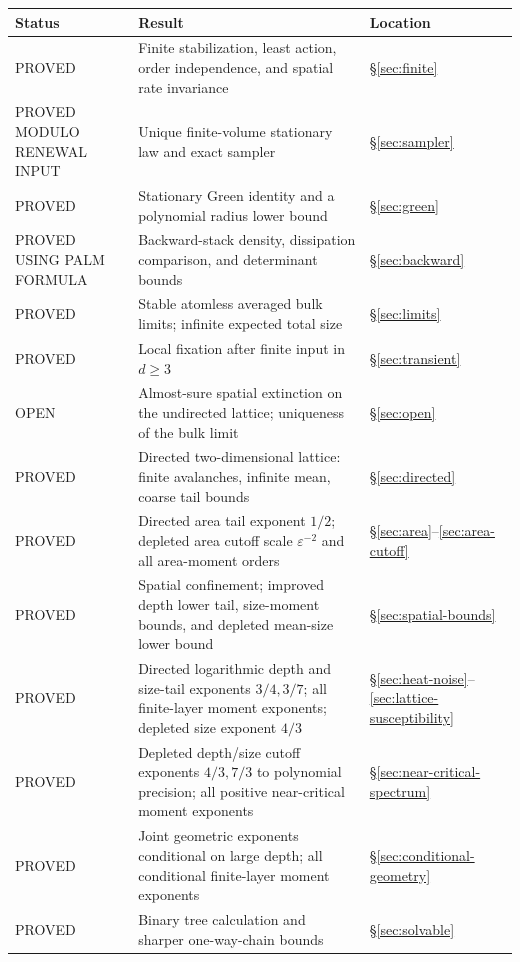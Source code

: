 \documentclass[11pt]{article}
\numberwithin{equation}{section}
\theoremstyle{definition}
\begin{document}
\begin{longtable}{@{}>{\raggedright\arraybackslash}p{}>{\raggedright\arraybackslash}p{}>{\raggedright\arraybackslash}p{}@{}}
\toprule
Status & Result & Location\\\midrule\endhead
PROVED & Finite stabilization, least action, order independence, and spatial rate invariance & \S\ref{sec:finite}\\
PROVED MODULO RENEWAL INPUT & Unique finite-volume stationary law and exact sampler & \S\ref{sec:sampler}\\
PROVED & Stationary Green identity and a polynomial radius lower bound & \S\ref{sec:green}\\
PROVED USING PALM FORMULA & Backward-stack density, dissipation comparison, and determinant bounds & \S\ref{sec:backward}\\
PROVED & Stable atomless averaged bulk limits; infinite expected total size & \S\ref{sec:limits}\\
PROVED & Local fixation after finite input in $d\ge3$ & \S\ref{sec:transient}\\
OPEN & Almost-sure spatial extinction on the undirected lattice; uniqueness of the bulk limit & \S\ref{sec:open}\\
PROVED & Directed two-dimensional lattice: finite avalanches, infinite mean, coarse tail bounds & \S\ref{sec:directed}\\
PROVED & Directed area tail exponent $1/2$; depleted area cutoff scale $\varepsilon^{-2}$ and all area-moment orders & \S\ref{sec:area}--\ref{sec:area-cutoff}\\
PROVED & Spatial confinement; improved depth lower tail, size-moment bounds, and depleted mean-size lower bound & \S\ref{sec:spatial-bounds}\\
PROVED & Directed logarithmic depth and size-tail exponents $3/4,3/7$; all finite-layer moment exponents; depleted size exponent $4/3$ & \S\ref{sec:heat-noise}--\ref{sec:lattice-susceptibility}\\
PROVED & Depleted depth/size cutoff exponents $4/3,7/3$ to polynomial precision; all positive near-critical moment exponents & \S\ref{sec:near-critical-spectrum}\\
PROVED & Joint geometric exponents conditional on large depth; all conditional finite-layer moment exponents & \S\ref{sec:conditional-geometry}\\
PROVED & Binary tree calculation and sharper one-way-chain bounds & \S\ref{sec:solvable}\\

\end{longtable}
\end{document}
